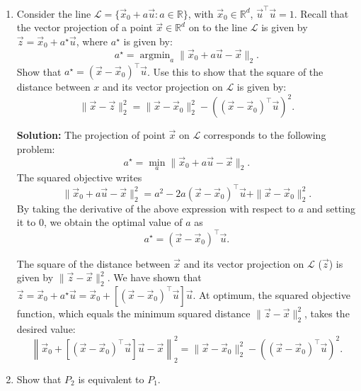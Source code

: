 \documentclass[10pt]{article}
\theoremstyle{definition}
\theoremstyle{plain}
\newcommand{\RR}{\mathbb{R}}
\DeclareMathOperator{\argmin}{argmin}
\begin{document}
\begin{enumerate}[label=(\alph*)]
\item Consider the line $\mathcal{L} = \{\vec{x}_0 + a\vec{u} : a \in \RR\}$, with $\vec{x}_0 \in \RR^d$, $\vec{u}^\top \vec{u} = 1$. Recall that the vector projection of a point $\vec{x} \in \RR^d$ on to the line $\mathcal{L}$ is given by $\vec{z} = \vec{x}_0 + a^\star \vec{u}$, where $a^\star$ is given by:
\begin{equation}
a^\star = \argmin_a \|\vec{x}_0 + a\vec{u} - \vec{x}\|_2.
\end{equation}
Show that $a^\star = (\vec{x} - \vec{x}_0)^\top \vec{u}$. Use this to show that the square of the distance between $x$ and its vector projection on $\mathcal{L}$ is given by:
\begin{equation}
\|\vec{x} - \vec{z}\|_2^2 = \|\vec{x} - \vec{x}_0\|_2^2 - ((\vec{x} - \vec{x}_0)^\top \vec{u})^2.
\end{equation}

\textbf{Solution:} The projection of point $\vec{x}$ on $\mathcal{L}$ corresponds to the following problem:
\begin{equation}
a^\star = \min_a \|\vec{x}_0 + a\vec{u} - \vec{x}\|_2.
\end{equation}
The squared objective writes
\begin{equation}
\|\vec{x}_0 + a\vec{u} - \vec{x}\|_2^2 = a^2 - 2a(\vec{x} - \vec{x}_0)^\top \vec{u} + \|\vec{x} - \vec{x}_0\|_2^2.
\end{equation}
By taking the derivative of the above expression with respect to $a$ and setting it to 0, we obtain the optimal value of $a$ as
\begin{equation}
a^\star = (\vec{x} - \vec{x}_0)^\top \vec{u}.
\end{equation}

The square of the distance between $\vec{x}$ and its vector projection on $\mathcal{L}$ ($\vec{z}$) is given by $\|\vec{z} - \vec{x}\|_2^2$. We have shown that $\vec{z} = \vec{x}_0 + a^\star \vec{u} = \vec{x}_0 + [(\vec{x} - \vec{x}_0)^\top \vec{u}]\vec{u}$. At optimum, the squared objective function, which equals the minimum squared distance $\|\vec{z} - \vec{x}\|_2^2$, takes the desired value:
\begin{equation}
\left\|\vec{x}_0 + [(\vec{x} - \vec{x}_0)^\top \vec{u}]\vec{u} - \vec{x}\right\|_2^2 = \|\vec{x} - \vec{x}_0\|_2^2 - ((\vec{x} - \vec{x}_0)^\top \vec{u})^2.
\end{equation}

\item Show that $P_2$ is equivalent to $P_1$.


\end{enumerate}
\end{document}
